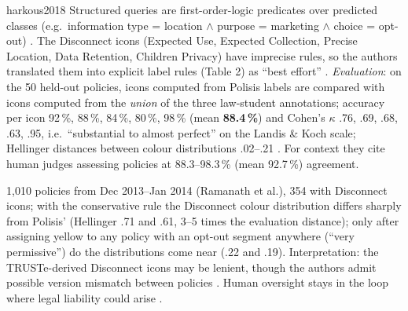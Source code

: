 \begin{papercard}{harkous2018}
 Structured queries are first-order-logic predicates over predicted classes (e.g.\ information type = location $\wedge$ purpose = marketing $\wedge$ choice = opt-out) . The Disconnect icons (Expected Use, Expected Collection, Precise Location, Data Retention, Children Privacy) have imprecise rules, so the authors translated them into explicit label rules (Table 2) as ``best effort'' . \emph{Evaluation}: on the 50 held-out policies, icons computed from Polisis labels are compared with icons computed from the \emph{union} of the three law-student annotations; accuracy per icon 92\,\%, 88\,\%, 84\,\%, 80\,\%, 98\,\% (mean \textbf{88.4\,\%}) and Cohen's $\kappa$ .76, .69, .68, .63, .95, i.e.\ ``substantial to almost perfect'' on the Landis \& Koch scale; Hellinger distances between colour distributions .02--.21 . For context they cite human judges assessing policies at 88.3--98.3\,\% (mean 92.7\,\%) agreement.

 1,010 policies from Dec 2013--Jan 2014 (Ramanath et al.), 354 with Disconnect icons; with the conservative rule the Disconnect colour distribution differs sharply from Polisis' (Hellinger .71 and .61, 3--5 times the evaluation distance); only after assigning yellow to any policy with an opt-out segment anywhere (``very permissive'') do the distributions come near (.22 and .19). Interpretation: the TRUSTe-derived Disconnect icons may be lenient, though the authors admit possible version mismatch between policies . Human oversight stays in the loop where legal liability could arise .


\end{papercard}
